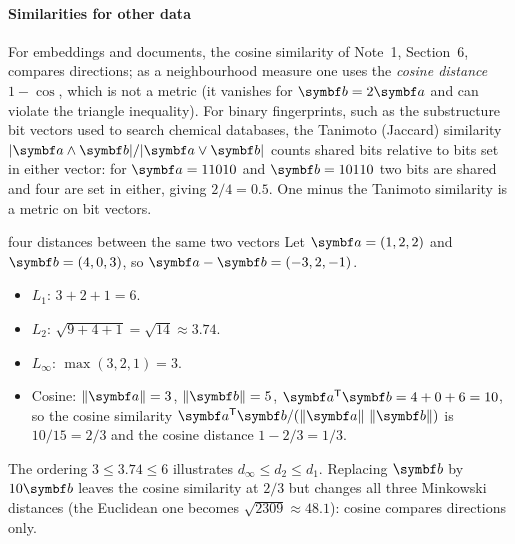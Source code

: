 \documentclass[11pt]{article}
\begin{document}
\paragraph{Similarities for other data} For embeddings and documents, the cosine similarity of Note~1, Section~6,
compares directions; as a neighbourhood measure one uses the \emph{cosine distance} $1 - \cos$, which is not a metric
(it vanishes for $\vect{b} = 2\vect{a}$ and can violate the triangle inequality). For binary fingerprints, such as
the substructure bit vectors used to search chemical databases, the Tanimoto (Jaccard) similarity
$|\vect{a} \wedge \vect{b}| / |\vect{a} \vee \vect{b}|$ counts shared bits relative to bits set in either vector: for
$\vect{a} = 11010$ and $\vect{b} = 10110$ two bits are shared and four are set in either, giving $2/4 = 0.5$. One minus
the Tanimoto similarity is a metric on bit vectors.

\begin{worked}{four distances between the same two vectors}
Let $\vect{a} = (1, 2, 2)$ and $\vect{b} = (4, 0, 3)$, so $\vect{a} - \vect{b} = (-3, 2, -1)$.
\begin{itemize}
\item $L_1$: $3 + 2 + 1 = 6$.
\item $L_2$: $\sqrt{9 + 4 + 1} = \sqrt{14} \approx 3.74$.
\item $L_\infty$: $\max(3, 2, 1) = 3$.
\item Cosine: $\norm{\vect{a}} = 3$, $\norm{\vect{b}} = 5$, $\vect{a}\T\vect{b} = 4 + 0 + 6 = 10$, so the cosine
similarity $\vect{a}\T\vect{b}/(\norm{\vect{a}}\,\norm{\vect{b}})$ is $10/15 = 2/3$ and the cosine distance
$1 - 2/3 = 1/3$.
\end{itemize}
The ordering $3 \le 3.74 \le 6$ illustrates $d_\infty \le d_2 \le d_1$. Replacing $\vect{b}$ by $10\vect{b}$
leaves the cosine similarity at $2/3$ but changes all three Minkowski distances (the Euclidean one becomes
$\sqrt{2309} \approx 48.1$): cosine compares directions only.
\end{worked}
\end{document}
